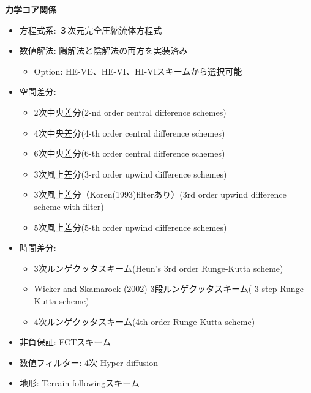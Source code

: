 {\bf 力学コア関係}
\begin{itemize}
 \item 方程式系: ３次元完全圧縮流体方程式
 \item 数値解法: 陽解法と陰解法の両方を実装済み
   \begin{itemize}
    \item Option: HE-VE、HE-VI、HI-VIスキームから選択可能
   \end{itemize}
 \item 空間差分:
    \begin{itemize}
      \item 2次中央差分(2-nd order central difference schemes)
      \item 4次中央差分(4-th order central difference schemes)
      \item 6次中央差分(6-th order central difference schemes)
      \item 3次風上差分(3-rd order upwind difference schemes)
      \item 3次風上差分（Koren(1993)filterあり）(3rd order upwind difference scheme with \cite{Koren_1993} filter)
      \item 5次風上差分(5-th order upwind difference schemes)
    \end{itemize}
 \item 時間差分:
    \begin{itemize}
      \item 3次ルンゲクッタスキーム(Heun's 3rd order Runge-Kutta scheme)
      \item Wicker and Skamarock (2002) 3段ルンゲクッタスキーム(\citet{Wicker_2002} 3-step Runge-Kutta scheme)
      \item 4次ルンゲクッタスキーム(4th order Runge-Kutta scheme)
    \end{itemize}
 \item 非負保証: FCTスキーム
 \item 数値フィルター: 4次 Hyper diffusion
 \item 地形: Terrain-followingスキーム
\end{itemize}


